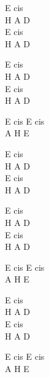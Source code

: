 \begin{chord}
    E cis\\
    H A D\\
    E cis\\
    H A D

    E cis\\
    H A D\\
    E cis\\
    H A D

    E cis E cis\\
    A H E

    E cis\\
    H A D\\
    E cis\\
    H A D

    E cis\\
    H A D\\
    E cis\\
    H A D

    E cis E cis\\
    A H E

    E cis\\
    H A D\\
    E cis\\
    H A D

    E cis E cis\\
    A H E
\end{chord}